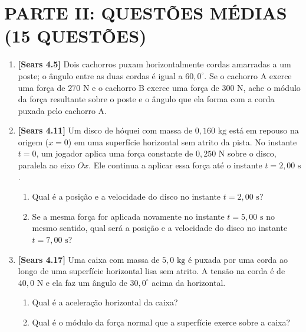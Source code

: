 \documentclass[11pt,a4paper]{article}
\begin{document}
\newpage
\section*{PARTE II: QUESTÕES MÉDIAS (15 QUESTÕES)}

\begin{enumerate}[label=\textbf{\arabic*.}, leftmargin=*, itemsep=0.45cm, resume]

\item \textbf{[Sears 4.5]} Dois cachorros puxam horizontalmente cordas amarradas a um poste; o ângulo entre as duas cordas é igual a $60,0^\circ$. Se o cachorro A exerce uma força de $270\text{ N}$ e o cachorro B exerce uma força de $300\text{ N}$, ache o módulo da força resultante sobre o poste e o ângulo que ela forma com a corda puxada pelo cachorro A.

\item \textbf{[Sears 4.11]} Um disco de hóquei com massa de $0,160\text{ kg}$ está em repouso na origem ($x = 0$) em uma superfície horizontal sem atrito da pista. No instante $t = 0$, um jogador aplica uma força constante de $0,250\text{ N}$ sobre o disco, paralela ao eixo $Ox$. Ele continua a aplicar essa força até o instante $t = 2,00\text{ s}$.
\begin{enumerate}[label=\alph*)]
    \item Qual é a posição e a velocidade do disco no instante $t = 2,00\text{ s}$?
    \item Se a mesma força for aplicada novamente no instante $t = 5,00\text{ s}$ no mesmo sentido, qual será a posição e a velocidade do disco no instante $t = 7,00\text{ s}$?
\end{enumerate}

\item \textbf{[Sears 4.17]} Uma caixa com massa de $5,0\text{ kg}$ é puxada por uma corda ao longo de uma superfície horizontal lisa sem atrito. A tensão na corda é de $40,0\text{ N}$ e ela faz um ângulo de $30,0^\circ$ acima da horizontal.
\begin{enumerate}[label=\alph*)]
    \item Qual é a aceleração horizontal da caixa?
    \item Qual é o módulo da força normal que a superfície exerce sobre a caixa?
\end{enumerate}


\end{enumerate}
\end{document}
